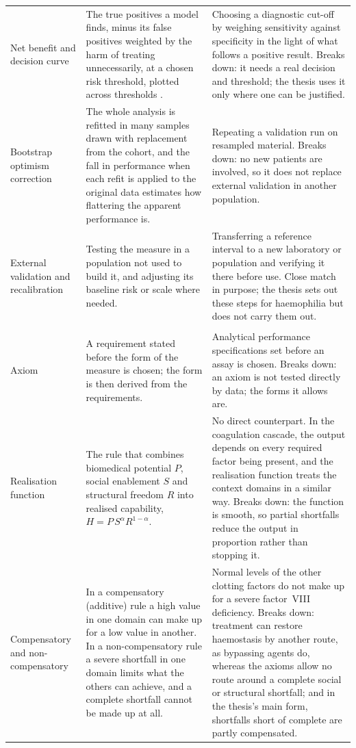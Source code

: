 \begin{longtable}{>{\raggedright\arraybackslash}p{2.7cm} >{\raggedright\arraybackslash}p{4.6cm} >{\raggedright\arraybackslash}p{6.6cm}}
Net benefit and decision curve & The true positives a model finds, minus its false positives weighted by the harm of treating unnecessarily, at a chosen risk threshold, plotted across thresholds \citep{vickers_elkin_2006}. & Choosing a diagnostic cut-off by weighing sensitivity against specificity in the light of what follows a positive result. Breaks down: it needs a real decision and threshold; the thesis uses it only where one can be justified. \\
Bootstrap optimism correction & The whole analysis is refitted in many samples drawn with replacement from the cohort, and the fall in performance when each refit is applied to the original data estimates how flattering the apparent performance is. & Repeating a validation run on resampled material. Breaks down: no new patients are involved, so it does not replace external validation in another population. \\
External validation and recalibration & Testing the measure in a population not used to build it, and adjusting its baseline risk or scale where needed. & Transferring a reference interval to a new laboratory or population and verifying it there before use. Close match in purpose; the thesis sets out these steps for haemophilia but does not carry them out. \\
\midrule
\multicolumn{3}{l}{\textit{The realisation model}} \\
\addlinespace
Axiom & A requirement stated before the form of the measure is chosen; the form is then derived from the requirements. & Analytical performance specifications set before an assay is chosen. Breaks down: an axiom is not tested directly by data; the forms it allows are. \\
Realisation function & The rule that combines biomedical potential $P$, social enablement $S$ and structural freedom $R$ into realised capability, $H=P\,S^{\alpha}R^{1-\alpha}$. & No direct counterpart. In the coagulation cascade, the output depends on every required factor being present, and the realisation function treats the context domains in a similar way. Breaks down: the function is smooth, so partial shortfalls reduce the output in proportion rather than stopping it. \\
Compensatory and non-compensatory & In a compensatory (additive) rule a high value in one domain can make up for a low value in another. In a non-compensatory rule a severe shortfall in one domain limits what the others can achieve, and a complete shortfall cannot be made up at all. & Normal levels of the other clotting factors do not make up for a severe factor~VIII deficiency. Breaks down: treatment can restore haemostasis by another route, as bypassing agents do, whereas the axioms allow no route around a complete social or structural shortfall; and in the thesis's main form, shortfalls short of complete are partly compensated. \\

\end{longtable}
